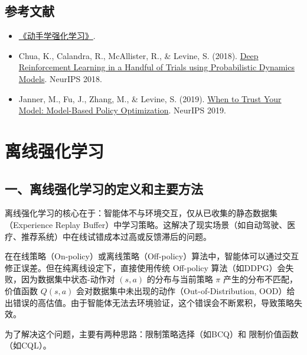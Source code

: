 \hypertarget{ux53c2ux8003ux6587ux732e-63}{%
\subsection{参考文献}\label{ux53c2ux8003ux6587ux732e-63}}

\vspace{0.25em}
\begin{itemize}
\tightlist
\item
  \href{https://hrl.boyuai.com/}{《动手学强化学习》}.
\item
  Chua, K., Calandra, R., McAllister, R., \& Levine, S. (2018). \href{https://arxiv.org/abs/1805.12114}{Deep Reinforcement Learning in a Handful of Trials using Probabilistic Dynamics Models}. NeurIPS 2018.
\item
  Janner, M., Fu, J., Zhang, M., \& Levine, S. (2019). \href{https://arxiv.org/abs/1906.08253}{When to Trust Your Model: Model-Based Policy Optimization}. NeurIPS 2019.
\end{itemize}

\clearpage

\hypertarget{ux79bbux7ebfux5f3aux5316ux5b66ux4e60}{%
\section{离线强化学习}\label{ux79bbux7ebfux5f3aux5316ux5b66ux4e60}}

\hypertarget{ux4e00ux79bbux7ebfux5f3aux5316ux5b66ux4e60ux7684ux5b9aux4e49ux548cux4e3bux8981ux65b9ux6cd5}{%
\subsection{一、离线强化学习的定义和主要方法}\label{ux4e00ux79bbux7ebfux5f3aux5316ux5b66ux4e60ux7684ux5b9aux4e49ux548cux4e3bux8981ux65b9ux6cd5}}

离线强化学习的核心在于：智能体不与环境交互，仅从已收集的静态数据集（Experience Replay Buffer）中学习策略。这解决了现实场景（如自动驾驶、医疗、推荐系统）中在线试错成本过高或反馈滞后的问题。

在在线策略（On-policy）或离线策略（Off-policy）算法中，智能体可以通过交互修正误差。但在纯离线设定下，直接使用传统 Off-policy 算法（如DDPG）会失败，因为数据集中状态-动作对 \((s,a)\) 的分布与当前策略 \(\pi\) 产生的分布不匹配，价值函数 \(Q(s,a)\) 会对数据集中未出现的动作（Out-of-Distribution, OOD）给出错误的高估值。由于智能体无法去环境验证，这个错误会不断累积，导致策略失效。

为了解决这个问题，主要有两种思路：限制策略选择（如BCQ）和 限制价值函数（如CQL）。


